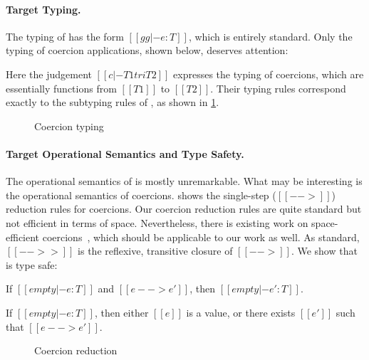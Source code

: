 \paragraph{Target Typing.}
The typing of \tname has the form $[[gg |- e : T]]$, which is entirely standard. Only the typing of coercion
applications, shown below, deserves attention:
\begin{mathpar}
\end{mathpar}
Here the judgement $[[c |- T1 tri T2]]$ expresses the typing of coercions, which
are essentially functions from $[[T1]]$ to $[[T2]]$. Their typing
rules correspond exactly to the subtyping rules of \namee, as
shown in \cref{fig:co}.

\begin{figure}[t]
  \centering
  \caption{Coercion typing}
  \label{fig:co}
\end{figure}

\paragraph{Target Operational Semantics and Type Safety.}

The operational semantics of \tname is mostly unremarkable. What may be
interesting is the operational semantics of coercions. 
shows the single-step ($[[-->]]$) reduction rules for coercions. Our coercion
reduction rules are quite standard but not efficient in terms of space.
Nevertheless, there is existing work on space-efficient
coercions~\cite{Siek_2015, herman2010space}, which should be applicable
to our work as well.
As standard, $[[-->>]]$ is the reflexive, transitive closure of $[[-->]]$.
We show that \tname is type safe:
\begin{theorem}[Preservation]
  If $[[empty |- e : T]]$ and $[[e --> e']]$, then $[[empty |- e' : T]]$.
\end{theorem}
\begin{theorem}[Progress]
  If $[[empty |- e : T]]$, then either $[[e]]$ is a value, or there exists $[[e']]$ such
  that $[[e --> e']]$.
\end{theorem}


\begin{figure}[t]
  \centering
{}
  \caption{Coercion reduction}
  \label{fig:coercion_red}
\end{figure}




